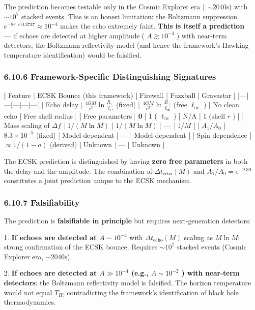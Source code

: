 \documentclass[11pt,a4paper]{article}
\theoremstyle{definition}
\theoremstyle{remark}
\begin{document}
The prediction becomes testable only in the Cosmic Explorer era ( $\sim$2040s) with $\sim 10^7$ stacked events. This is an honest limitation: the Boltzmann suppression $e^{-8\pi \times 0.3737} \approx 10^{-4}$ makes the echo extremely faint. \textbf{This is itself a prediction} — if echoes are detected at higher amplitude ( $A \gtrsim 10^{-3}$ ) with near-term detectors, the Boltzmann reflectivity model (and hence the framework's Hawking temperature identification) would be falsified.

\subsubsection{6.10.6 Framework-Specific Distinguishing Signatures}

| Feature | ECSK Bounce (this framework) | Firewall | Fuzzball | Gravastar |
|---|---|---|---|---|
| Echo delay | $\frac{4GM}{c^3}\ln\frac{R_+}{\ell_P}$ (fixed) | $\frac{4GM}{c^3}\ln\frac{R_+}{\ell_{\text{fw}}}$ (free $\ell_{\text{fw}}$ ) | No clean echo | Free shell radius |
| Free parameters | \textbf{0} | 1 ( $\ell_{\text{fw}}$ ) | N/A | 1 (shell $r$ ) |
| Mass scaling of $\Delta f$ | $1/(M \ln M)$ | $1/(M \ln M)$ | — | $1/M$ |
| $A_1/A_0$ | $8.3 \times 10^{-5}$ (fixed) | Model-dependent | — | Model-dependent |
| Spin dependence | $\propto 1/(1-a)$ (derived) | Unknown | — | Unknown |

The ECSK prediction is distinguished by having \textbf{zero free parameters} in both the delay and the amplitude. The combination of $\Delta t_{\text{echo}}(M)$ and $A_1/A_0 = e^{-9.39}$ constitutes a joint prediction unique to the ECSK mechanism.

\subsubsection{6.10.7 Falsifiability}

The prediction is \textbf{falsifiable in principle} but requires next-generation detectors:

1. \textbf{If echoes are detected at $A \sim 10^{-4}$} with $\Delta t_{\text{echo}}(M)$ scaling as $M \ln M$: strong confirmation of the ECSK bounce. Requires $\sim 10^7$ stacked events (Cosmic Explorer era, $\sim$2040s).

2. \textbf{If echoes are detected at $A \gg 10^{-4}$ (e.g., $A \sim 10^{-2}$ ) with near-term detectors}: the Boltzmann reflectivity model is falsified. The horizon temperature would not equal $T_H$, contradicting the framework's identification of black hole thermodynamics.
\end{document}
